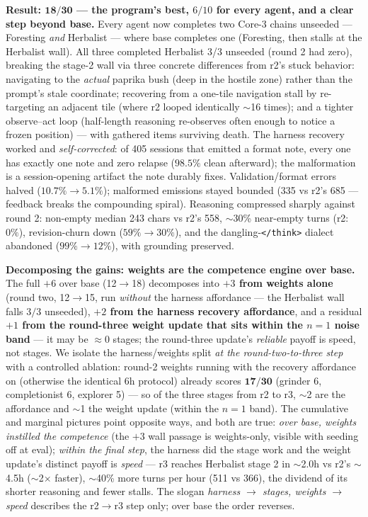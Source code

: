 \documentclass[11pt]{article}
\begin{document}
\textbf{Result: $\mathbf{18/30}$ --- the program's best, $6/10$ for every agent, and a clear
step beyond base.} Every agent now completes two Core-3 chains unseeded --- Foresting \emph{and}
Herbalist --- where base completes one (Foresting, then stalls at the Herbalist wall). All three
completed Herbalist 3/3 unseeded (round 2 had zero), breaking the stage-2 wall via three
concrete differences from r2's stuck behavior: navigating to the \emph{actual} paprika bush
(deep in the hostile zone) rather than the prompt's stale coordinate; recovering from a one-tile
navigation stall by re-targeting an adjacent tile (where r2 looped identically $\sim$16 times);
and a tighter observe--act loop (half-length reasoning re-observes often enough to notice a
frozen position) --- with gathered items surviving death. The harness recovery worked and
\emph{self-corrected}: of 405 sessions that emitted a format note, every one has exactly one note
and zero relapse ($98.5\%$ clean afterward); the malformation is a session-opening artifact the
note durably fixes. Validation/format errors halved ($10.7\% \rightarrow 5.1\%$); malformed
emissions stayed bounded (335 vs r2's 685 --- feedback breaks the compounding spiral). Reasoning
compressed sharply against round 2: non-empty median 243 chars vs r2's 558, $\sim$30\% near-empty
turns (r2: $0\%$), revision-churn down ($59\% \rightarrow 30\%$), and the
dangling-\texttt{</think>} dialect abandoned ($99\% \rightarrow 12\%$), with grounding preserved.

\textbf{Decomposing the gains: weights are the competence engine over base.} The full $+6$ over
base (12$\rightarrow$18) decomposes into \textbf{$+3$ from weights alone} (round two,
12$\rightarrow$15, run \emph{without} the harness affordance --- the Herbalist wall falls $3/3$
unseeded), \textbf{$+2$ from the harness recovery affordance}, and a residual \textbf{$+1$ from the
round-three weight update that sits within the $n{=}1$ noise band} --- it may be $\approx\!0$
stages; the round-three update's \emph{reliable} payoff is speed, not stages. We isolate the
harness/weights split \emph{at the round-two-to-three step} with a controlled ablation: round-2 weights running with the recovery affordance on
(otherwise the identical 6h protocol) already scores $\mathbf{17/30}$ (grinder 6, completionist 6,
explorer 5) --- so of the three stages from r2 to r3, $\sim$2 are the affordance and $\sim$1 the
weight update (within the $n{=}1$ band). The cumulative and marginal pictures point opposite ways,
and both are true: \emph{over base, weights instilled the competence} (the $+3$ wall passage is
weights-only, visible with seeding off at eval); \emph{within the final step}, the harness did the
stage work and the weight update's distinct payoff is \emph{speed} --- r3 reaches Herbalist stage
2 in $\sim$2.0h vs r2's $\sim$4.5h ($\sim$2$\times$ faster), $\sim$40\% more turns per hour (511 vs
366), the dividend of its shorter reasoning and fewer stalls. The slogan \emph{harness
$\rightarrow$ stages, weights $\rightarrow$ speed} describes the r2$\rightarrow$r3 step only; over
base the order reverses.
\end{document}
